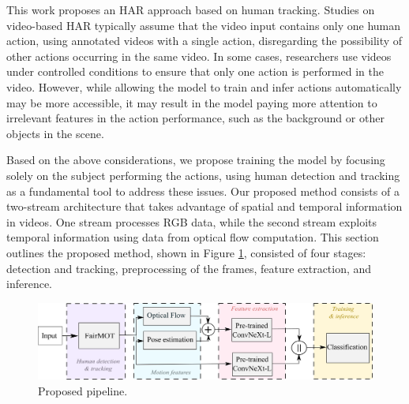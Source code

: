 \documentclass[mathematics,article,submit,pdftex,moreauthors]{Definitions/mdpi}
\begin{document}


This work proposes an HAR approach based on human tracking. Studies on video-based HAR typically assume that the video input contains only one human action, using annotated videos with a single action, disregarding the possibility of other actions occurring in the same video. In some cases, researchers use videos under controlled conditions to ensure that only one action is performed in the video. However, while allowing the model to train and infer actions automatically may be more accessible, it may result in the model paying more attention to irrelevant features in the action performance, such as the background or other objects in the scene.

Based on the above considerations, we propose training the model by focusing solely on the subject performing the actions, using human detection and tracking as a fundamental tool to address these issues. Our proposed method consists of a two-stream architecture that takes advantage of spatial and temporal information in videos. One stream processes RGB data, while the second stream exploits temporal information using data from optical flow computation. 
This section outlines the proposed method, shown in Figure \ref{pipeline},  
consisted of four stages: detection and tracking, preprocessing of the frames, feature extraction, and inference. 

\begin{figure}[H]
\includegraphics[width=13.7 cm]{Definitions/general_pipeline_proposed_method_mdpi.png}
\caption{Proposed pipeline.\label{pipeline}}
\end{figure}   
\end{document}
